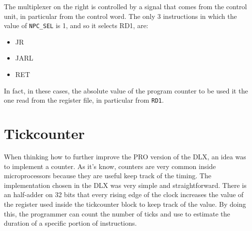 The multiplexer on the right is controlled by a signal that comes from the control unit, in particular from the control word. The only 3 instructions in which the value of \texttt{NPC\_SEL} is 1, and so it selects RD1, are:

\begin{itemize}
  \item JR
  \item JARL
  \item RET
\end{itemize}

In fact, in these cases, the absolute value of the program counter to be used it the one read from the register file, in particular from \texttt{RD1}.

\section{Tickcounter}
When thinking how to further improve the PRO version of the DLX, an idea was to implement a counter. As it's know, counters are very common inside microprocessors because they are useful keep track of the timing. 
The implementation chosen in the DLX was very simple and straightforward. There is an half-adder on 32 bits that every rising edge of the clock increases the value of the register used inside the tickcounter block to keep track of the value. By doing this, the programmer can count the number of ticks and use to estimate the duration of a specific portion of instructions.
